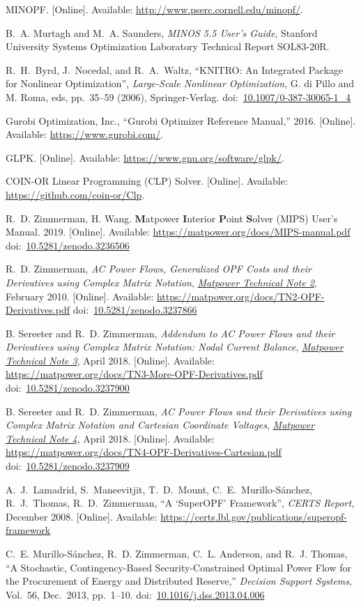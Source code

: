\documentclass[12pt]{article}
\newcommand{\matpower}[0]{{\sc Matpower}}
\newcommand{\mips}[0]{{MIPS}}
\newcommand{\mipsname}[0]{{{\bf M}{\sc atpower} \textbf{I}nterior \textbf{P}oint \textbf{S}olver}}
\newcommand{\currentmipsmanurl}[0]{https://matpower.org/docs/MIPS-manual.pdf}
\newcommand{\TNtwourl}[0]{https://matpower.org/docs/TN2-OPF-Derivatives.pdf}
\newcommand{\TNtwo}[0]{\href{\TNtwourl}{\it \matpower{} Technical Note 2}}
\newcommand{\TNthreeurl}[0]{https://matpower.org/docs/TN3-More-OPF-Derivatives.pdf}
\newcommand{\TNthree}[0]{\href{\TNthreeurl}{\it \matpower{} Technical Note 3}}
\newcommand{\TNfoururl}[0]{https://matpower.org/docs/TN4-OPF-Derivatives-Cartesian.pdf}
\newcommand{\TNfour}[0]{\href{\TNfoururl}{\it \matpower{} Technical Note 4}}
\newcommand{\doi}[1]{doi:~\href{https://doi.org/#1}{#1}}
\numberwithin{equation}{section}
\numberwithin{table}{section}
\numberwithin{figure}{section}
\begin{document}
\begin{thebibliography}{99}
MINOPF. [Online]. Available:
  \url{http://www.pserc.cornell.edu/minopf/}.

B.~A. Murtagh and M.~A. Saunders, \emph{MINOS 5.5 User's Guide}, Stanford
  University Systems Optimization Laboratory Technical Report SOL83-20R.

R.~H.~Byrd, J.~Nocedal, and R.~A.~Waltz, ``KNITRO: An Integrated Package for Nonlinear Optimization'', \emph{Large-Scale Nonlinear Optimization}, G. di Pillo and M. Roma, eds, pp.~35--59 (2006), Springer-Verlag.
doi:~\href{https://doi.org/10.1007/0-387-30065-1_4}{10.1007/0-387-30065-1\_4}

Gurobi Optimization, Inc., ``Gurobi Optimizer Reference Manual,'' 2016. [Online]. Available:
  \url{https://www.gurobi.com/}.

GLPK. [Online]. Available:
  \url{https://www.gnu.org/software/glpk/}.

COIN-OR Linear Programming (CLP) Solver. [Online]. Available:
  \url{https://github.com/coin-or/Clp}.

R.~D. Zimmerman, H. Wang. \mipsname{} (\mips{}) User's Manual. 2019. [Online]. Available: \url{\currentmipsmanurl}
\doi{10.5281/zenodo.3236506}

R.~D. Zimmerman, \emph{AC Power Flows, Generalized OPF Costs and their Derivatives using Complex Matrix Notation}, \TNtwo, February 2010. [Online]. Available: \url{\TNtwourl}
\doi{10.5281/zenodo.3237866}

B. Sereeter and R.~D. Zimmerman, \emph{Addendum to AC Power Flows and their Derivatives using Complex Matrix Notation: Nodal Current Balance}, \TNthree, April 2018. [Online]. Available: \url{\TNthreeurl}
\doi{10.5281/zenodo.3237900}

B. Sereeter and R.~D. Zimmerman, \emph{AC Power Flows and their Derivatives using Complex Matrix Notation and Cartesian Coordinate Voltages}, \TNfour, April 2018. [Online]. Available: \url{\TNfoururl}
\doi{10.5281/zenodo.3237909}

A.~J.~Lamadrid, S.~Maneevitjit, T.~D.~Mount, C.~E.~Murillo-S{\'a}nchez, R.~J.~Thomas, R.~D.~Zimmerman, ``A `SuperOPF' Framework'', \emph{CERTS Report}, December 2008. [Online]. Available: \url{https://certs.lbl.gov/publications/superopf-framework}

C.~E. Murillo-S{\'a}nchez, R.~D. Zimmerman, C.~L. Anderson, and R.~J. Thomas, ``A Stochastic, Contingency-Based Security-Constrained Optimal Power Flow for the Procurement of Energy and Distributed Reserve,'' \emph{Decision Support Systems}, Vol.~56, Dec.~2013, pp.~1--10.
\doi{10.1016/j.dss.2013.04.006}


\end{thebibliography}
\end{document}
